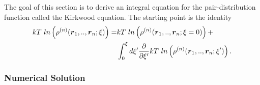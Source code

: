 
The goal of this section is to derive an integral equation for the pair-distribution function called the Kirkwood equation.
The starting point is the identity
\begin{align}
kT~ln\left(\rho^{(n)}(\boldsymbol{r}_1,..,\boldsymbol{r}_n;\xi)\right) =
&kT~ln\left(\rho^{(n)}(\boldsymbol{r}_1,..,\boldsymbol{r}_n;\xi=0)\right) + \nonumber \\
& \int_0^\xi d\xi' \frac{\partial}{\partial \xi'}
kT~ln\left(\rho^{(n)}(\boldsymbol{r}_1,..,\boldsymbol{r}_n;\xi')\right).
\end{align}


\subsubsection{Numerical Solution}




